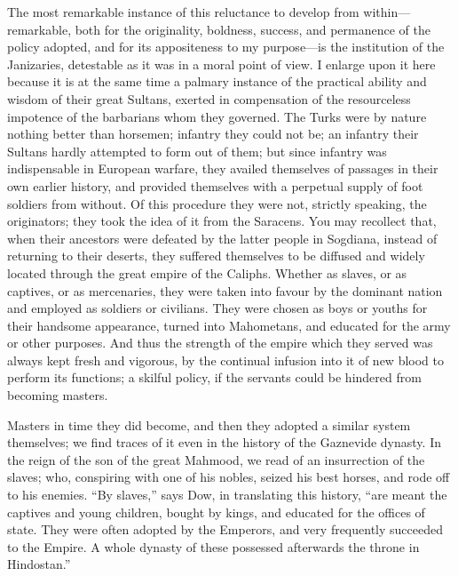 The most remarkable instance
of this reluctance to develop from within—remarkable, both for the
originality, boldness, success, and permanence of the policy adopted,
and for its appositeness to my purpose—is the institution of the
Janizaries, detestable as it was in a moral point of view. I enlarge
upon it here because it is at the same time a palmary instance of the
practical ability and wisdom of their great Sultans, exerted in
compensation of the resourceless impotence of the barbarians whom they
governed. The Turks were by nature nothing better than horsemen;
infantry they could not be; an infantry their Sultans hardly attempted
to form out of them; but since infantry was indispensable in European
warfare, they availed themselves of passages in their own earlier
history, and provided themselves with a perpetual supply of foot
soldiers from without. Of this procedure they were not, strictly
speaking, the originators; they took the idea of it from the Saracens.
You may recollect that, when their ancestors were defeated by the
latter people in Sogdiana, instead of returning to their
deserts, they suffered themselves to be diffused and widely located
through the great empire of the Caliphs. Whether as slaves, or as
captives, or as mercenaries, they were taken into favour by the
dominant nation and employed as soldiers or civilians. They were
chosen as boys or youths for their handsome appearance, turned into
Mahometans, and educated for the army or other purposes. And thus the
strength of the empire which they served was always kept fresh and
vigorous, by the continual infusion into it of new blood to perform
its functions; a skilful policy, if the servants could be hindered
from becoming masters.

Masters in time they did
become, and then they adopted a similar system themselves; we find
traces of it even in the history of the Gaznevide dynasty. In the
reign of the son of the great Mahmood, we read of an insurrection of
the slaves; who, conspiring with one of his nobles, seized his best
horses, and rode off to his enemies. ``By slaves,'' says Dow, in
translating this history, ``are meant the captives and young children,
bought by kings, and educated for the offices of state. They were
often adopted by the Emperors, and very frequently succeeded to the
Empire. A whole dynasty of these possessed afterwards the throne in
Hindostan.''

